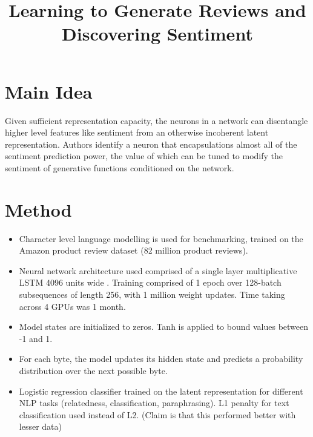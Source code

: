 \documentclass[12pt]{article}
\begin{document}
\title{Learning to Generate Reviews and Discovering Sentiment}
\author{}
\date{}
\maketitle

\section{Main Idea}
  Given sufficient representation capacity, the neurons in a network can disentangle higher level features like sentiment from an otherwise incoherent latent representation. Authors identify a neuron that encapsulations almost all of the sentiment prediction power, the value of which can be tuned to modify the sentiment of generative functions conditioned on the network.

\section{Method}
  \begin{itemize}
    \item Character level language modelling is used for benchmarking, trained on the Amazon product review dataset (82 million product reviews).
    \item Neural network architecture used comprised of a single layer multiplicative LSTM 4096 units wide \cite{krause2016multiplicative}. Training comprised of 1 epoch over 128-batch subsequences of length 256, with 1 million weight updates. Time taking across 4 GPUs was 1 month.
    \item Model states are initialized to zeros.  Tanh is applied to bound values between -1 and 1.
    \item For each byte, the model updates its hidden state and predicts a probability distribution over the next possible byte.
    \item Logistic regression classifier trained on the latent representation for different NLP tasks (relatedness, classification, paraphrasing). L1 penalty for text classification used instead of L2. (Claim is that this performed better with lesser data)
  \end{itemize}
\end{document}
